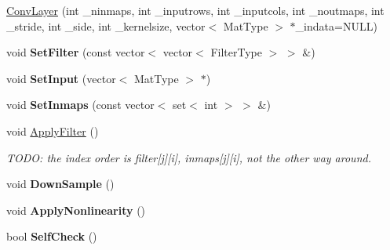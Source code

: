 \begin{DoxyCompactItemize}
\item 
\hyperlink{class_conv_layer_a7516441d146b575d8ba191278fe8ba9d}{Conv\+Layer} (int \+\_\+ninmaps, int \+\_\+inputrows, int \+\_\+inputcols, int \+\_\+noutmaps, int \+\_\+stride, int \+\_\+side, int \+\_\+kernelsize, vector$<$ Mat\+Type $>$ $\ast$\+\_\+indata=N\+U\+L\+L)
\item 
\hypertarget{class_conv_layer_ad7b04710a903116d88fcc017b2ca4f2f}{void {\bfseries Set\+Filter} (const vector$<$ vector$<$ Filter\+Type $>$ $>$ \&)}\label{class_conv_layer_ad7b04710a903116d88fcc017b2ca4f2f}

\item 
\hypertarget{class_conv_layer_a585102c25508332b6ab2799409393204}{void {\bfseries Set\+Input} (vector$<$ Mat\+Type $>$ $\ast$)}\label{class_conv_layer_a585102c25508332b6ab2799409393204}

\item 
\hypertarget{class_conv_layer_a8bb67f36834497242e12d0eea4ece95a}{void {\bfseries Set\+Inmaps} (const vector$<$ set$<$ int $>$ $>$ \&)}\label{class_conv_layer_a8bb67f36834497242e12d0eea4ece95a}

\item 
\hypertarget{class_conv_layer_a70111098046a07416fcbdffdbe8f0cfd}{void \hyperlink{class_conv_layer_a70111098046a07416fcbdffdbe8f0cfd}{Apply\+Filter} ()}\label{class_conv_layer_a70111098046a07416fcbdffdbe8f0cfd}

\begin{DoxyCompactList}\small\item\em T\+O\+D\+O\+: the index order is filter\mbox{[}j\mbox{]}\mbox{[}i\mbox{]}, inmaps\mbox{[}j\mbox{]}\mbox{[}i\mbox{]}, not the other way around. \end{DoxyCompactList}\item 
\hypertarget{class_conv_layer_a8970249425ba935d91bc0f0a530ea13c}{void {\bfseries Down\+Sample} ()}\label{class_conv_layer_a8970249425ba935d91bc0f0a530ea13c}

\item 
\hypertarget{class_conv_layer_a5e5a5da58cb21ca2894ecf55088a2636}{void {\bfseries Apply\+Nonlinearity} ()}\label{class_conv_layer_a5e5a5da58cb21ca2894ecf55088a2636}

\item 
\hypertarget{class_conv_layer_aea08727ba47d3c813e309cc278860bbd}{bool {\bfseries Self\+Check} ()}\label{class_conv_layer_aea08727ba47d3c813e309cc278860bbd}

\end{DoxyCompactItemize}

